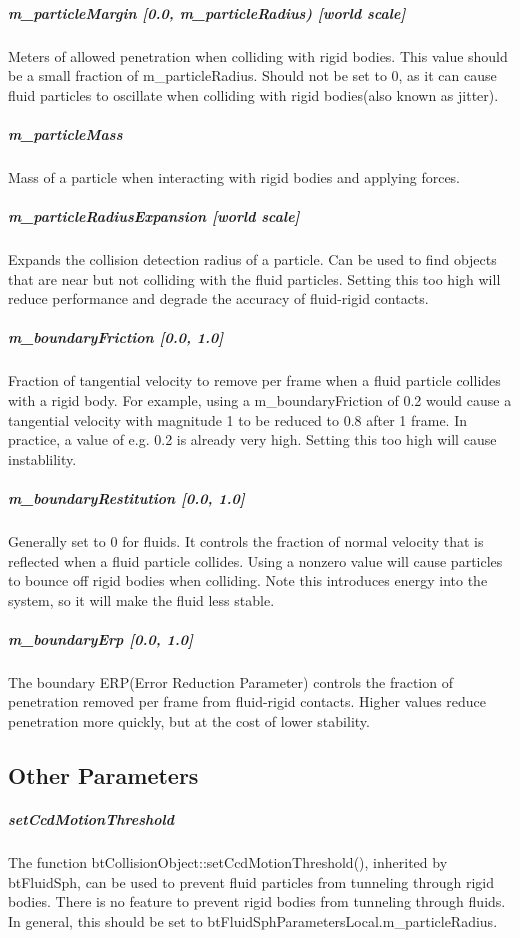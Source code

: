 \documentclass[]{article}
\begin{document}
			\subparagraph{m\_particleMargin [0.0, m\_particleRadius) [world scale]}
				Meters of allowed penetration when colliding with rigid bodies. This value should be a small fraction of
				m\_particleRadius. Should not be set to 0, as it can cause fluid particles to oscillate when colliding
				with rigid bodies(also known as jitter).
				
			\subparagraph{m\_particleMass}
				Mass of a particle when interacting with rigid bodies and applying forces.
				
			\subparagraph{m\_particleRadiusExpansion [world scale]}
				Expands the collision detection radius of a particle. Can be used to find objects that are near but not
				colliding with the fluid particles. Setting this too high will reduce performance and degrade the accuracy
				of fluid-rigid contacts.
				
			\subparagraph{m\_boundaryFriction [0.0, 1.0]}
				Fraction of tangential velocity to remove per frame when a fluid particle collides with a rigid body. For 
				example, using a m\_boundaryFriction of 0.2 would cause a tangential velocity with magnitude 1 to be 
				reduced to 0.8 after 1 frame. In practice, a value of e.g. 0.2 is already very high. Setting this too high 
				will cause instablility.
				
			\subparagraph{m\_boundaryRestitution [0.0, 1.0]}
				Generally set to 0 for fluids. It controls the fraction of normal velocity that is reflected when a fluid 
				particle collides. Using a nonzero value will cause particles to bounce off rigid bodies when colliding. 
				Note this introduces energy into the system, so it will make the fluid less stable.
				
			\subparagraph{m\_boundaryErp [0.0, 1.0]}
				The boundary ERP(Error Reduction Parameter) controls the fraction of penetration removed per frame from
			fluid-rigid contacts. Higher values reduce penetration more quickly, but at the cost of lower stability.
		
	\subsection{Other Parameters}
		\subparagraph{setCcdMotionThreshold}
			The function btCollisionObject::setCcdMotionThreshold(), inherited by btFluidSph,
			can be used to prevent fluid particles from tunneling through rigid bodies.
			There is no feature to prevent rigid bodies from tunneling through fluids.
			In general, this should be set to btFluidSphParametersLocal.m\_particleRadius.
			
\end{document}

